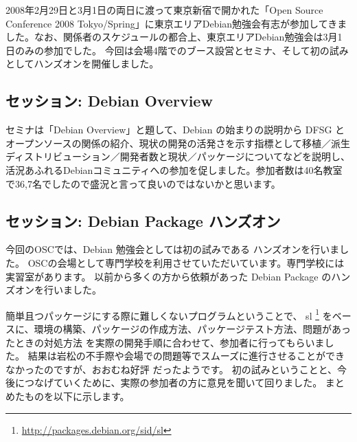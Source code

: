 \documentclass[mingoth,a4paper]{jsarticle}
\begin{document}
2008年2月29日と3月1日の両日に渡って東京新宿で開かれた「Open Source Conference 2008 Tokyo/Spring」に東京エリアDebian勉強会有志が参加してきました。なお、関係者のスケジュールの都合上、東京エリアDebian勉強会は3月1日のみの参加でした。
今回は会場4階でのブース設営とセミナ、そして初の試みとしてハンズオンを開催しました。

\subsection{セッション: Debian Overview}
セミナは「Debian Overview」と題して、Debian の始まりの説明から DFSG とオープンソースの関係の紹介、現状の開発の活発さを示す指標として移植／派生ディストリビューション／開発者数と現状／パッケージについてなどを説明し、活況あふれるDebianコミュニティへの参加を促しました。参加者数は40名教室で36,7名でしたので盛況と言って良いのではないかと思います。

\subsection{セッション: Debian Package ハンズオン}
今回のOSCでは、Debian 勉強会としては初の試みである ハンズオンを行いました。
OSCの会場として専門学校を利用させていただいています。専門学校には実習室があります。
以前から多くの方から依頼があった Debian Package のハンズオンを行いました。

簡単且つパッケージにする際に難しくないプログラムということで、
sl \footnote{\url{http://packages.debian.org/sid/sl}}
をベースに、環境の構築、パッケージの作成方法、パッケージテスト方法、問題があったときの対処方法
を実際の開発手順に合わせて、参加者に行ってもらいました。
結果は岩松の不手際や会場での問題等でスムーズに進行させることができなかったのですが、おおむね好評
だったようです。
初の試みということと、今後につなげていくために、実際の参加者の方に意見を聞いて回りました。
まとめたものを以下に示します。
\end{document}
